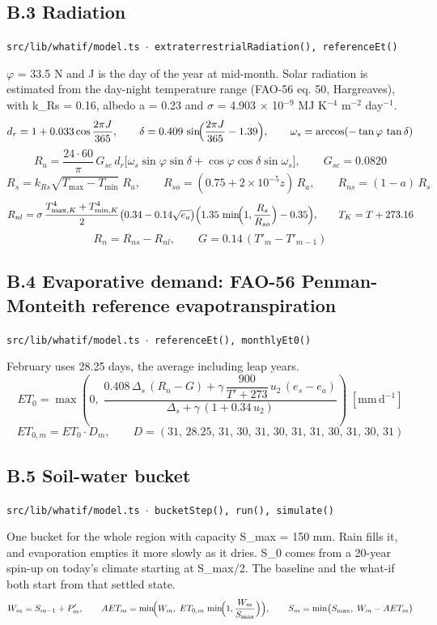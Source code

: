 \documentclass[10pt,a4paper]{article}
\begin{document}
\subsection*{B.3 Radiation}
{\footnotesize\texttt{src/lib/whatif/model.ts $\cdot$ extraterrestrialRadiation(), referenceEt()}}

$\varphi$ = 33.5\textdegree{} N and J is the day of the year at mid-month. Solar radiation is estimated from the day-night temperature range (FAO-56 eq. 50, Hargreaves), with k\_Rs = 0.16, albedo a = 0.23 and $\sigma$ = 4.903 $\times$ 10$^{-9}$ MJ K$^{-4}$ m$^{-2}$ day$^{-1}$.
\[
d_r = 1 + 0.033\cos\frac{2\pi J}{365}, \qquad \delta = 0.409\,\sin\!\Bigl(\frac{2\pi J}{365} - 1.39\Bigr), \qquad \omega_s = \arccos(-\tan\varphi\,\tan\delta)
\]
\[
R_a = \frac{24\cdot 60}{\pi}\, G_{sc}\, d_r \bigl[\omega_s \sin\varphi\sin\delta + \cos\varphi\cos\delta\sin\omega_s\bigr], \qquad G_{sc} = 0.0820
\]
\[
R_s = k_{Rs}\sqrt{T_{\max} - T_{\min}}\; R_a, \qquad R_{so} = (0.75 + 2\times10^{-5} z)\, R_a, \qquad R_{ns} = (1 - a)\,R_s
\]
\[
R_{nl} = \sigma\,\frac{T_{\max,K}^4 + T_{\min,K}^4}{2}\bigl(0.34 - 0.14\sqrt{e_a}\bigr)\Bigl(1.35\,\min\!\Bigl(1, \frac{R_s}{R_{so}}\Bigr) - 0.35\Bigr), \qquad T_K = T + 273.16
\]
\[
R_n = R_{ns} - R_{nl}, \qquad G = 0.14\,(T'_m - T'_{m-1})
\]

\subsection*{B.4 Evaporative demand: FAO-56 Penman-Monteith reference evapotranspiration}
{\footnotesize\texttt{src/lib/whatif/model.ts $\cdot$ referenceEt(), monthlyEt0()}}

February uses 28.25 days, the average including leap years.
\[
ET_0 = \max\!\left(0,\; \frac{0.408\,\Delta_s\,(R_n - G) + \gamma\,\dfrac{900}{T' + 273}\,u_2\,(e_s - e_a)}{\Delta_s + \gamma\,(1 + 0.34\,u_2)}\right) \;[\mathrm{mm\,d^{-1}}]
\]
\[
ET_{0,m} = ET_0 \cdot D_m, \qquad D = (31,\, 28.25,\, 31,\, 30,\, 31,\, 30,\, 31,\, 31,\, 30,\, 31,\, 30,\, 31)
\]

\subsection*{B.5 Soil-water bucket}
{\footnotesize\texttt{src/lib/whatif/model.ts $\cdot$ bucketStep(), run(), simulate()}}

One bucket for the whole region with capacity S\_max = 150 mm. Rain fills it, and evaporation empties it more slowly as it dries. S\_0 comes from a 20-year spin-up on today's climate starting at S\_max/2. The baseline and the what-if both start from that settled state.
\[
W_m = S_{m-1} + P'_m, \qquad AET_m = \min\!\Bigl(W_m,\; ET_{0,m}\,\min\!\Bigl(1, \frac{W_m}{S_{\max}}\Bigr)\Bigr), \qquad S_m = \min\bigl(S_{\max},\; W_m - AET_m\bigr)
\]
\end{document}
